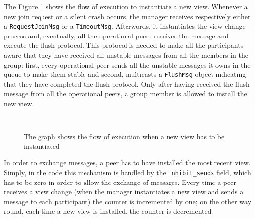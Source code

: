\documentclass[conference]{IEEEtran}
\begin{document}
The Figure \ref{fig:NewView} shows the flow of execution to instantiate a new view. Whenever a new join request or a silent crash occurs, the manager receives respectively either a \texttt{RequestJoinMsg} or a \texttt{TimeoutMsg}. Afterwords, it instantiates the view change process and, eventually, all the operational peers receives the message and execute the flush protocol. This protocol is needed to make all the participants aware that they have received all unstable messages from all the members in the group: first, every operational peer sends all the unstable messages it owns in the queue to make them stable and second,  multicasts a \texttt{FlushMsg} object indicating that they have completed the flush protocol. Only after having received the flush message from all the operational peers, a group member is allowed to install the new view.
\begin{figure}[ht]%
	\centering
	\\%
	\caption{The graph shows the flow of execution when a new view has
	to be instantiated}%
	\label{fig:NewView}%
\end{figure}
In order to exchange messages, a peer has to have installed the most recent view. Simply, in the code this mechanism is handled by the \texttt{inhibit\_sends} field, which has to be zero in order to allow the exchange of messages. Every time a peer receives a view change (when the manager instantiates a new view and sends a message to each participant) the counter is incremented by one; on the other way round, each time a new view is installed, the counter is decremented.
\end{document}
